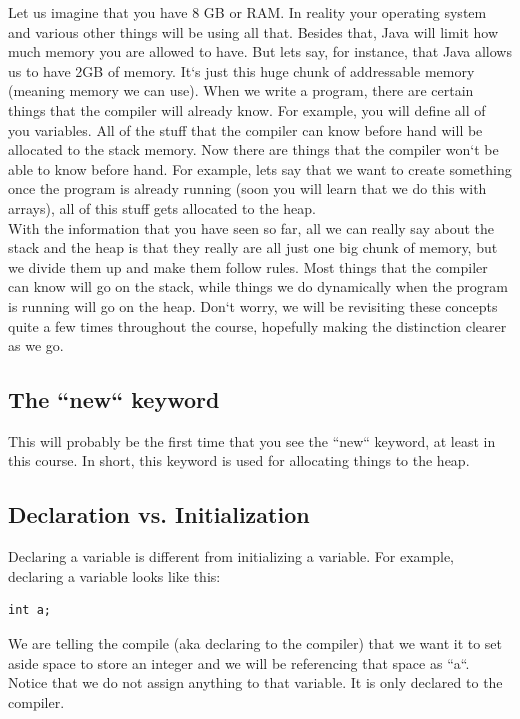 \documentclass[11]{article}
\begin{document}
Let us imagine that you have 8 GB or RAM. In reality your operating system and various other things will be using all that. Besides that, Java will limit how much memory you are allowed to have. But lets say, for instance, that Java allows us to have 2GB of memory. It`s just this huge chunk of addressable memory (meaning memory we can use). When we write a program, there are certain things that the compiler will already know. For example, you will define all of you variables. All of the stuff that the compiler can know before hand will be allocated to the stack memory. Now there are things that the compiler won`t be able to know before hand. For example, lets say that we want to create something once the program is already running (soon you will learn that we do this with arrays), all of this stuff gets allocated to the heap.\\

With the information that you have seen so far, all we can really say about the stack and the heap is that they really are all just one big chunk of memory, but we divide them up and make them follow rules. Most things that the compiler can know will go on the stack, while things we do dynamically when the program is running will go on the heap. Don`t worry, we will be revisiting these concepts quite a few times throughout the course, hopefully making the distinction clearer as we go.

\subsection{The ``new`` keyword}
This will probably be the first time that you see the ``new`` keyword, at least in this course. In short, this keyword is used for allocating things to the heap.
\subsection{Declaration vs. Initialization}
Declaring a variable is different from initializing a variable. For example, declaring a variable looks like this:
\begin{lstlisting}
int a;
\end{lstlisting}

We are telling the compile (aka declaring to the compiler) that we want it to set aside space to store an integer and we will be referencing that space as ``a``.  Notice that we do not assign anything to that variable. It is only declared to the compiler.\\
\end{document}
